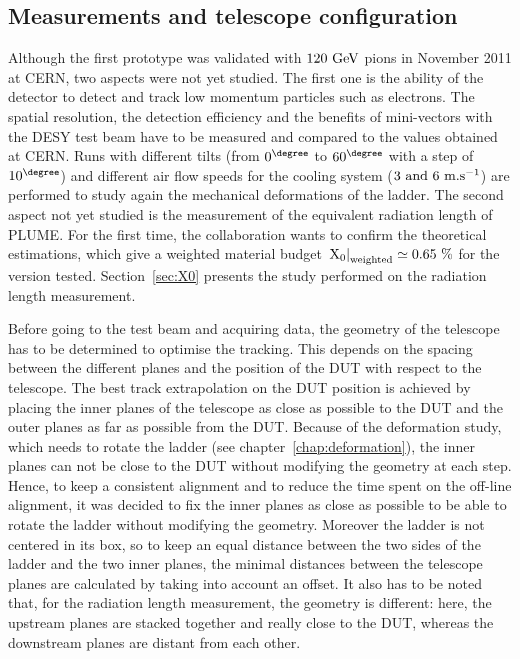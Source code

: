     \subsection{Measurements and telescope configuration}

    Although the first prototype was validated with $120~\rm{GeV}$ pions in November 2011 at CERN, two aspects were not yet studied.
    The first one is the ability of the detector to detect and track low momentum particles such as electrons.
    The spatial resolution, the detection efficiency and the benefits of mini-vectors with the DESY test beam have to be measured and compared to the values obtained at CERN.
    Runs with different tilts (from $0^{\degree}$ to $60^{\degree}$ with a step of $10^{\degree}$) and different air flow speeds for the cooling system ($3~\rm{and}~6~\rm{m.s}^{-1}$) are performed to study again the mechanical deformations of the ladder.
    The second aspect not yet studied is the measurement of the equivalent radiation length of \gls{PLUME}.
    For the first time, the collaboration wants to confirm the theoretical estimations, which give a weighted material budget $\left. \rm{X_{0}}\right|_{\rm{weighted}} \simeq 0.65~\%$ for the version tested.
    Section~\ref{sec:X0} presents the study performed on the radiation length measurement.

    Before going to the test beam and acquiring data, the geometry of the telescope has to be determined to optimise the tracking.
    This depends on the spacing between the different planes and the position of the \gls{DUT} with respect to the telescope.
    The best track extrapolation on the \gls{DUT} position is achieved by placing the inner planes of the telescope as close as possible to the \gls{DUT} and the outer planes as far as possible from the \gls{DUT}.
    Because of the deformation study, which needs to rotate the ladder (see chapter~\ref{chap:deformation}), the inner planes can not be close to the \gls{DUT} without modifying the geometry at each step.
    Hence, to keep a consistent alignment and to reduce the time spent on the off-line alignment, it was decided to fix the inner planes as close as possible to be able to rotate the ladder without modifying the geometry.
    Moreover the ladder is not centered in its box, so to keep an equal distance between the two sides of the ladder and the two inner planes, the minimal distances between the telescope planes are calculated by taking into account an offset.
    It also has to be noted that, for the radiation length measurement, the geometry is different: here, the upstream planes are stacked together and really close to the \gls{DUT}, whereas the downstream planes are distant from each other.

